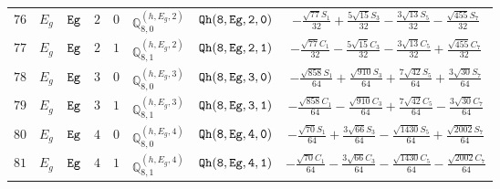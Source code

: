 \documentclass[fleqn,8pt]{jsarticle}
\begin{document}
\begin{table}[ht!]
\begin{center}
\begin{tabular}{cccccccc}
$ 76 $ & $ E_{g} $ & $ {\tt Eg} $ & $ 2 $ & $ 0 $ & $ \mathbb{Q}_{8,0}^{(h,E_{g},2)} $ & $ {\tt Qh(8,Eg,2,0)} $ & $ - \frac{\sqrt{77} S_{1}}{32} + \frac{5 \sqrt{15} S_{3}}{32} - \frac{3 \sqrt{13} S_{5}}{32} - \frac{\sqrt{455} S_{7}}{32} $ \\
$ 77 $ & $ E_{g} $ & $ {\tt Eg} $ & $ 2 $ & $ 1 $ & $ \mathbb{Q}_{8,1}^{(h,E_{g},2)} $ & $ {\tt Qh(8,Eg,2,1)} $ & $ - \frac{\sqrt{77} C_{1}}{32} - \frac{5 \sqrt{15} C_{3}}{32} - \frac{3 \sqrt{13} C_{5}}{32} + \frac{\sqrt{455} C_{7}}{32} $ \\
$ 78 $ & $ E_{g} $ & $ {\tt Eg} $ & $ 3 $ & $ 0 $ & $ \mathbb{Q}_{8,0}^{(h,E_{g},3)} $ & $ {\tt Qh(8,Eg,3,0)} $ & $ - \frac{\sqrt{858} S_{1}}{64} + \frac{\sqrt{910} S_{3}}{64} + \frac{7 \sqrt{42} S_{5}}{64} + \frac{3 \sqrt{30} S_{7}}{64} $ \\
$ 79 $ & $ E_{g} $ & $ {\tt Eg} $ & $ 3 $ & $ 1 $ & $ \mathbb{Q}_{8,1}^{(h,E_{g},3)} $ & $ {\tt Qh(8,Eg,3,1)} $ & $ - \frac{\sqrt{858} C_{1}}{64} - \frac{\sqrt{910} C_{3}}{64} + \frac{7 \sqrt{42} C_{5}}{64} - \frac{3 \sqrt{30} C_{7}}{64} $ \\
$ 80 $ & $ E_{g} $ & $ {\tt Eg} $ & $ 4 $ & $ 0 $ & $ \mathbb{Q}_{8,0}^{(h,E_{g},4)} $ & $ {\tt Qh(8,Eg,4,0)} $ & $ - \frac{\sqrt{70} S_{1}}{64} + \frac{3 \sqrt{66} S_{3}}{64} - \frac{\sqrt{1430} S_{5}}{64} + \frac{\sqrt{2002} S_{7}}{64} $ \\
$ 81 $ & $ E_{g} $ & $ {\tt Eg} $ & $ 4 $ & $ 1 $ & $ \mathbb{Q}_{8,1}^{(h,E_{g},4)} $ & $ {\tt Qh(8,Eg,4,1)} $ & $ - \frac{\sqrt{70} C_{1}}{64} - \frac{3 \sqrt{66} C_{3}}{64} - \frac{\sqrt{1430} C_{5}}{64} - \frac{\sqrt{2002} C_{7}}{64} $ \\
 \hline \hline
\end{tabular}
\end{center}
\end{table}
\end{document}
